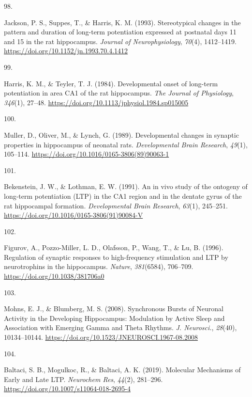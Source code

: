 \documentclass[
  11pt,
  letterpaper,
]{scrreprt}
\newlength{\cslhangindent}
\newlength{\csllabelwidth}
\newenvironment{CSLReferences}[2] %
 {\begin{list}{}{%
  \setlength{\itemindent}{0pt}
  \setlength{\leftmargin}{0pt}
  \setlength{\parsep}{0pt}
  \ifodd #1
   \setlength{\leftmargin}{\cslhangindent}
   \setlength{\itemindent}{-1\cslhangindent}
  \fi
  \setlength{\itemsep}{#2\baselineskip}}}
 {\end{list}}
\newcommand{\CSLLeftMargin}[1]{\parbox[t]{\csllabelwidth}{\strut#1\strut}}
\newcommand{\CSLRightInline}[1]{\parbox[t]{\linewidth - \csllabelwidth}{\strut#1\strut}}
\begin{document}
\begin{CSLReferences}{0}{0}
\CSLLeftMargin{98. }%
\CSLRightInline{Jackson, P. S., Suppes, T., \& Harris, K. M. (1993).
Stereotypical changes in the pattern and duration of long-term
potentiation expressed at postnatal days 11 and 15 in the rat
hippocampus. \emph{Journal of Neurophysiology}, \emph{70}(4),
1412--1419. \url{https://doi.org/10.1152/jn.1993.70.4.1412}}

\CSLLeftMargin{99. }%
\CSLRightInline{Harris, K. M., \& Teyler, T. J. (1984). Developmental
onset of long-term potentiation in area {CA1} of the rat hippocampus.
\emph{The Journal of Physiology}, \emph{346}(1), 27--48.
\url{https://doi.org/10.1113/jphysiol.1984.sp015005}}

\CSLLeftMargin{100. }%
\CSLRightInline{Muller, D., Oliver, M., \& Lynch, G. (1989).
Developmental changes in synaptic properties in hippocampus of neonatal
rats. \emph{Developmental Brain Research}, \emph{49}(1), 105--114.
\url{https://doi.org/10.1016/0165-3806(89)90063-1}}

\CSLLeftMargin{101. }%
\CSLRightInline{Bekenstein, J. W., \& Lothman, E. W. (1991). An in vivo
study of the ontogeny of long-term potentiation ({LTP}) in the {CA1}
region and in the dentate gyrus of the rat hippocampal formation.
\emph{Developmental Brain Research}, \emph{63}(1), 245--251.
\url{https://doi.org/10.1016/0165-3806(91)90084-V}}

\CSLLeftMargin{102. }%
\CSLRightInline{Figurov, A., Pozzo-Miller, L. D., Olafsson, P., Wang,
T., \& Lu, B. (1996). Regulation of synaptic responses to high-frequency
stimulation and {LTP} by neurotrophins in the hippocampus.
\emph{Nature}, \emph{381}(6584), 706--709.
\url{https://doi.org/10.1038/381706a0}}

\CSLLeftMargin{103. }%
\CSLRightInline{Mohns, E. J., \& Blumberg, M. S. (2008). Synchronous
{Bursts} of {Neuronal Activity} in the {Developing Hippocampus}:
{Modulation} by {Active Sleep} and {Association} with {Emerging Gamma}
and {Theta Rhythms}. \emph{J. Neurosci.}, \emph{28}(40), 10134--10144.
\url{https://doi.org/10.1523/JNEUROSCI.1967-08.2008}}

\CSLLeftMargin{104. }%
\CSLRightInline{Baltaci, S. B., Mogulkoc, R., \& Baltaci, A. K. (2019).
Molecular {Mechanisms} of {Early} and {Late LTP}. \emph{Neurochem Res},
\emph{44}(2), 281--296. \url{https://doi.org/10.1007/s11064-018-2695-4}}


\end{CSLReferences}
\end{document}
